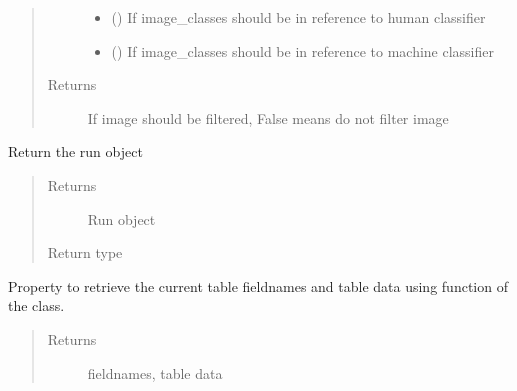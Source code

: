 \documentclass[letterpaper,10pt,english]{sphinxmanual}
\begin{document}
\begin{fulllineitems}
\begin{fulllineitems}
\begin{quote}
\begin{description}
\begin{itemize}
\item {} 
 () \textendash{} If image\_classes should be in reference to human classifier

\item {} 
 () \textendash{} If image\_classes should be in reference to machine classifier

\end{itemize}

\item[{Returns}] \leavevmode
If image should be filtered, False means do not filter image

\end{description}\end{quote}

\end{fulllineitems}


\begin{fulllineitems}
\label{\detokenize{polo.widgets:polo.widgets.table_viewer.TableViewer.run}}
Return the run object
\begin{quote}\begin{description}
\item[{Returns}] \leavevmode
Run object

\item[{Return type}] \leavevmode
{\hyperref[\detokenize{polo.crystallography:polo.crystallography.run.Run}]{}}

\end{description}\end{quote}

\end{fulllineitems}


\begin{fulllineitems}
\label{\detokenize{polo.widgets:polo.widgets.table_viewer.TableViewer.table_data}}
Property to retrieve the current table fieldnames and table data
using  function of the  class.
\begin{quote}\begin{description}
\item[{Returns}] \leavevmode
fieldnames, table data


\end{description}
\end{quote}
\end{fulllineitems}
\end{fulllineitems}
\end{document}
